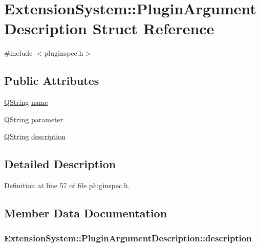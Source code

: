 \hypertarget{struct_extension_system_1_1_plugin_argument_description}{\section{Extension\-System\-:\-:Plugin\-Argument\-Description Struct Reference}
\label{struct_extension_system_1_1_plugin_argument_description}
}


{\ttfamily \#include $<$pluginspec.\-h$>$}

\subsection*{Public Attributes}
\begin{DoxyCompactItemize}
\item 
\hyperlink{group___u_a_v_objects_plugin_gab9d252f49c333c94a72f97ce3105a32d}{Q\-String} \hyperlink{struct_extension_system_1_1_plugin_argument_description_a495886e47df85811638066b4263f27a1}{name}
\item 
\hyperlink{group___u_a_v_objects_plugin_gab9d252f49c333c94a72f97ce3105a32d}{Q\-String} \hyperlink{struct_extension_system_1_1_plugin_argument_description_a451dd714bb63d9c2125491f142939b01}{parameter}
\item 
\hyperlink{group___u_a_v_objects_plugin_gab9d252f49c333c94a72f97ce3105a32d}{Q\-String} \hyperlink{struct_extension_system_1_1_plugin_argument_description_a8d39b6ae0e813cff56a3b2c7c9393e5c}{description}
\end{DoxyCompactItemize}


\subsection{Detailed Description}


Definition at line 57 of file pluginspec.\-h.



\subsection{Member Data Documentation}
\hypertarget{struct_extension_system_1_1_plugin_argument_description_a8d39b6ae0e813cff56a3b2c7c9393e5c}{
\subsubsection[{description}]{ Extension\-System\-::\-Plugin\-Argument\-Description\-::description}}\label{struct_extension_system_1_1_plugin_argument_description_a8d39b6ae0e813cff56a3b2c7c9393e5c}



